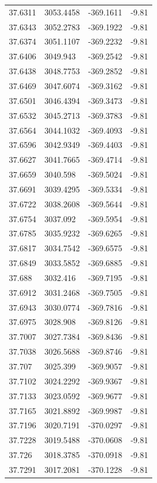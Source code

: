 \begin{table}[H]
\begin{tabular}{llll}
37.6311 & 3053.4458 & -369.1611 & -9.81 \\
37.6343 & 3052.2783 & -369.1922 & -9.81 \\
37.6374 & 3051.1107 & -369.2232 & -9.81 \\
37.6406 & 3049.943 & -369.2542 & -9.81 \\
37.6438 & 3048.7753 & -369.2852 & -9.81 \\
37.6469 & 3047.6074 & -369.3162 & -9.81 \\
37.6501 & 3046.4394 & -369.3473 & -9.81 \\
37.6532 & 3045.2713 & -369.3783 & -9.81 \\
37.6564 & 3044.1032 & -369.4093 & -9.81 \\
37.6596 & 3042.9349 & -369.4403 & -9.81 \\
37.6627 & 3041.7665 & -369.4714 & -9.81 \\
37.6659 & 3040.598 & -369.5024 & -9.81 \\
37.6691 & 3039.4295 & -369.5334 & -9.81 \\
37.6722 & 3038.2608 & -369.5644 & -9.81 \\
37.6754 & 3037.092 & -369.5954 & -9.81 \\
37.6785 & 3035.9232 & -369.6265 & -9.81 \\
37.6817 & 3034.7542 & -369.6575 & -9.81 \\
37.6849 & 3033.5852 & -369.6885 & -9.81 \\
37.688 & 3032.416 & -369.7195 & -9.81 \\
37.6912 & 3031.2468 & -369.7505 & -9.81 \\
37.6943 & 3030.0774 & -369.7816 & -9.81 \\
37.6975 & 3028.908 & -369.8126 & -9.81 \\
37.7007 & 3027.7384 & -369.8436 & -9.81 \\
37.7038 & 3026.5688 & -369.8746 & -9.81 \\
37.707 & 3025.399 & -369.9057 & -9.81 \\
37.7102 & 3024.2292 & -369.9367 & -9.81 \\
37.7133 & 3023.0592 & -369.9677 & -9.81 \\
37.7165 & 3021.8892 & -369.9987 & -9.81 \\
37.7196 & 3020.7191 & -370.0297 & -9.81 \\
37.7228 & 3019.5488 & -370.0608 & -9.81 \\
37.726 & 3018.3785 & -370.0918 & -9.81 \\
37.7291 & 3017.2081 & -370.1228 & -9.81 \\

\end{tabular}
\end{table}

